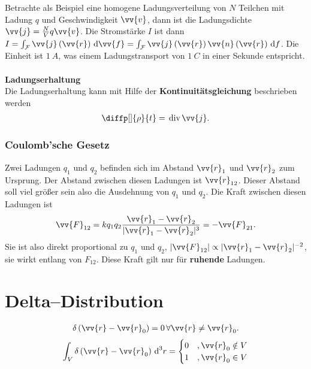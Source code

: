 \documentclass[a4paper,12pt]{article}
\newcommand{\td}{\,\text{d}}
\numberwithin{equation}{section}
\begin{document}
Betrachte als Beispiel eine homogene Ladungsverteilung von $N$ Teilchen mit Ladung $q$ und Geschwindigkeit $\vv{v}$, dann ist die Ladungsdichte $\vv{j}=\tfrac{N}{V}q\vv{v}$. 
Die Stromstärke $I$ ist dann $I=\int_{\mathcal{F}}^{}\vv{j}\left(\vv{r}\right)\td \vv{f}=\int_{\mathcal{F}}^{}\vv{j}\left(\vv{r}\right)\vv{n}\left(\vv{r}\right)\td f$.
Die Einheit ist $\SI{1}{A}$, was einem Ladungstransport von $\SI{1}{C}$ in einer Sekunde entspricht.
\\\hfill\\\textbf{Ladungserhaltung}\\ 
Die Ladungserhaltung kann mit Hilfe der \textbf{Kontinuitätsgleichung} beschrieben werden
\begin{align} 
        \diffp[]{\rho }{t}=\,\text{div}\,\vv{j}
.\end{align} 

\subsubsection{Coulomb'sche Gesetz}
Zwei Ladungen $q_1$ und $q_2$ befinden sich im Abstand $\vv{r}_1$ und $\vv{r}_2$ zum Ursprung.
Der Abstand zwischen diesen Ladungen ist $\vv{r}_{12}$.
Dieser Abstand soll viel größer sein also die Ausdehnung von $q_1$ und $q_2$.
Die Kraft zwischen diesen Ladungen ist
\begin{align} 
        \vv{F}_{12}=kq_1q_2\dfrac{\vv{r}_1-\vv{r}_2}{|\vv{r}_1-\vv{r}_2|^3}=-\vv{F}_{21}
.\end{align} 
Sie ist also direkt proportional zu $q_1$ und $q_2$, $|\vv{F}_{12}|\propto |\vv{r}_1-\vv{r}_2|^{-2}$, sie wirkt entlang von $F_{12}$.
Diese Kraft gilt nur für \textbf{ruhende} Ladungen.

\newpage
\section{Delta--Distribution}
\begin{align} 
        \delta \left(\vv{r}-\vv{r}_0\right)=0\,\forall \vv{r}\neq \vv{r}_0
.\end{align} 
\begin{align} 
        \int_{V}^{}\delta \left(\vv{r}-\vv{r}_0\right)\td ^3r=\begin{cases}
                0&,\vv{r}_0 \notin V\\1&,\vv{r}_0 \in V
        \end{cases}
\end{align} 


\end{document}
